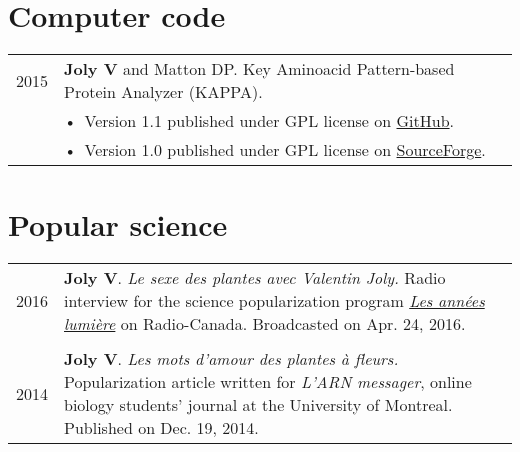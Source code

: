 \documentclass[letterpaper,12pt]{article}
\begin{document}
\vspace{6mm}

\section[Computer code]{Computer code}

\begin{tabularx}{\textwidth}{@{}r|X@{}}

2015
& \textbf{Joly V} and Matton DP. Key Aminoacid Pattern-based Protein Analyzer
  (KAPPA). \\
& \small \hspace{1.5mm} •~Version 1.1 published under GPL license on
  \href{https://github.com/valentinjoly/kappa-1.1}{GitHub}. \\
& \small \hspace{1.5mm} •~Version 1.0 published under GPL license on
  \href{https://sourceforge.net/projects/kappa-sequence-search/}{SourceForge}.
  \\

\end{tabularx}

\vspace{6mm}

\section[Popular science]{Popular science}

\begin{tabularx}{\textwidth}{@{}r|X@{}}

2016
& \textbf{Joly V}. {\em Le sexe des plantes avec Valentin Joly.} Radio
  interview for the science popularization program \href{http://ici.radio-canada.ca/emissions/les_annees_lumiere/2009-2010/chronique.asp?idChronique=404672}{\emph{Les années lumière}}
  on Radio-Canada. Broadcasted on Apr. 24, 2016. \\

\multicolumn{2}{c}{} \\

2014
& \textbf{Joly V}. {\em Les mots d’amour des plantes à fleurs.} Popularization
  article written for \emph{L'ARN messager}, online biology students' journal at
  the University of Montreal. Published on Dec. 19, 2014.
  \\

\end{tabularx}

\newpage

\end{document}
